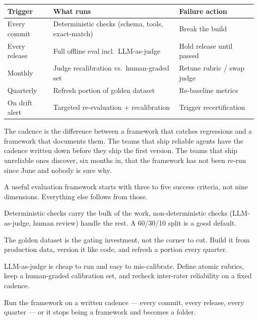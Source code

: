 \stoptwocol
\begin{center}
\small
\begin{tabular}{@{}lll@{}}
\toprule
\textbf{Trigger} & \textbf{What runs} & \textbf{Failure action} \\
\midrule
Every commit       & Deterministic checks (schema, tools, exact-match) & Break the build \\
Every release      & Full offline eval incl.\ LLM-as-judge             & Hold release until passed \\
Monthly            & Judge recalibration vs.\ human-graded set         & Retune rubric / swap judge \\
Quarterly          & Refresh portion of golden dataset                 & Re-baseline metrics \\
On drift alert     & Targeted re-evaluation + recalibration            & Trigger recertification \\
\bottomrule
\end{tabular}
\end{center}
\starttwocol

The cadence is the difference between a framework that catches regressions and a framework that documents them. The teams that ship reliable agents have the cadence written down before they ship the first version. The teams that ship unreliable ones discover, six months in, that the framework has not been re-run since June and nobody is sure why.

\TNrule

\stoptwocol

\begin{TNkeytakeaways}
\item A useful evaluation framework starts with three to five success criteria, not nine dimensions. Everything else follows from those.
\item Deterministic checks carry the bulk of the work, non-deterministic checks (LLM-as-judge, human review) handle the rest. A 60/30/10 split is a good default.
\item The golden dataset is the gating investment, not the corner to cut. Build it from production data, version it like code, and refresh a portion every quarter.
\item LLM-as-judge is cheap to run and easy to mis-calibrate. Define atomic rubrics, keep a human-graded calibration set, and recheck inter-rater reliability on a fixed cadence.
\item Run the framework on a written cadence --- every commit, every release, every quarter --- or it stops being a framework and becomes a folder.
\end{TNkeytakeaways}

